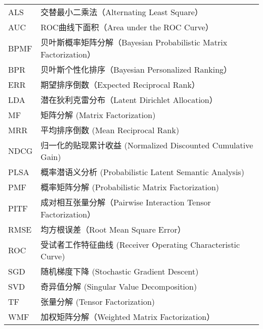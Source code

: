 \chapter*{}


	
\begin{tabular}{p{}p{}}
	ALS  & 交替最小二乘法（Alternating Least Square）  \\
	AUC  & ROC曲线下面积（Area under the ROC Curve）  \\
	BPMF  & 贝叶斯概率矩阵分解（Bayesian Probabilistic Matrix Factorization）  \\
	BPR  & 贝叶斯个性化排序（Bayesian Personalized Ranking）  \\
	ERR & 期望排序倒数（Expected Reciprocal Rank）  \\
	LDA  & 潜在狄利克雷分布（Latent Dirichlet Allocation）  \\
	MF  & 矩阵分解 (Matrix Factorization)  \\
	MRR  & 平均排序倒数 (Mean Reciprocal Rank) \\
	NDCG  & 归一化的贴现累计收益 (Normalized Discounted Cumulative Gain)  \\
	PLSA  & 概率潜语义分析 (Probabilistic Latent Semantic Analysis) \\
	PMF & 概率矩阵分解 (Probabilistic Matrix Factorization)  \\
	PITF & 成对相互张量分解（Pairwise Interaction Tensor Factorization）  \\
	RMSE & 均方根误差（Root Mean Square Error）\\
	ROC  & 受试者工作特征曲线 (Receiver Operating Characteristic Curve)  \\
	SGD & 随机梯度下降 (Stochastic Gradient Descent)  \\
	SVD & 奇异值分解 (Singular Value Decomposition)  \\
	TF  & 张量分解 (Tensor Factorization) \\
	WMF  & 加权矩阵分解（Weighted Matrix Factorization）  \\
\end{tabular}


\clearpage
\phantom{s}
\clearpage